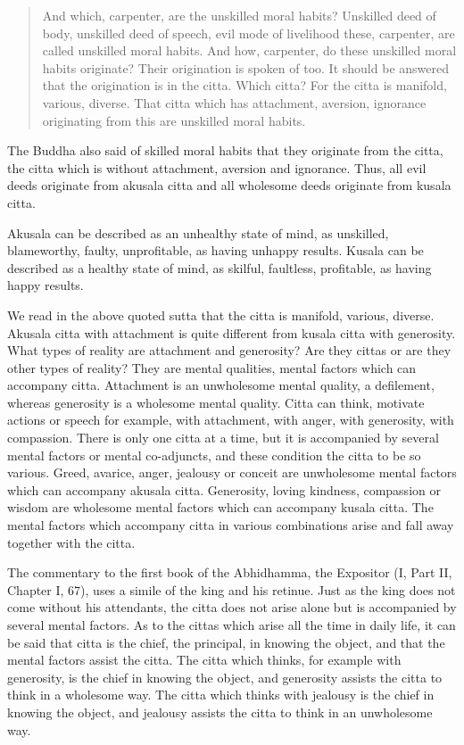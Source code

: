 \documentclass{book}
\begin{document}
\begin{quote}
And which, carpenter, are the unskilled moral habits? Unskilled deed of
body, unskilled deed of speech, evil mode of livelihood these,
carpenter, are called unskilled moral habits. And how, carpenter, do
these unskilled moral habits originate? Their origination is spoken of
too. It should be answered that the origination is in the citta. Which
citta? For the citta is manifold, various, diverse. That citta which has
attachment, aversion, ignorance originating from this are unskilled
moral habits.
\end{quote}

The Buddha also said of skilled moral habits that they originate from
the citta, the citta which is without attachment, aversion and
ignorance. Thus, all evil deeds originate from akusala citta and all
wholesome deeds originate from kusala citta.

Akusala can be described as an unhealthy state of mind, as unskilled,
blameworthy, faulty, unprofitable, as having unhappy results. Kusala can
be described as a healthy state of mind, as skilful, faultless,
profitable, as having happy results.

We read in the above quoted sutta that the citta is manifold, various,
diverse. Akusala citta with attach­ment is quite different from
kusala citta with generosity. What types of reality are attachment and
generosity? Are they cittas or are they other types of reality? They are
mental qualities, mental factors which can accompany citta. Attachment
is an unwholesome mental quality, a defilement, whereas generosity is a
wholesome mental quality. Citta can think, motivate actions or speech
for example, with attachment, with anger, with generosity, with
compassion. There is only one citta at a time, but it is accompanied by
several mental factors or mental co-adjuncts, and these condition the
citta to be so various. Greed, avarice, anger, jealousy or conceit are
unwhole­some mental factors which can accompany akusala citta.
Generosity, loving kindness, compassion or wisdom are whole­some mental
factors which can accompany kusala citta. The mental factors which
accompany citta in various combina­tions arise and fall away together
with the citta.

The commentary to the first book of the Abhidhamma, the Expositor (I,
Part II, Chapter I, 67), uses a simile of the king and his retinue. Just
as the king does not come without his attendants, the citta does not
arise alone but is accompanied by several mental factors. As to the
cittas which arise all the time in daily life, it can be said that citta
is the chief, the principal, in knowing the object, and that the mental
factors assist the citta. The citta which thinks, for example with
generosity, is the chief in knowing the object, and generosity assists
the citta to think in a wholesome way. The citta which thinks with
jealousy is the chief in knowing the object, and jealousy assists the
citta to think in an unwholesome way.
\end{document}
